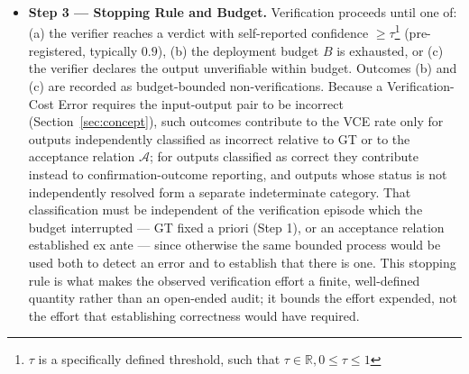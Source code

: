 \documentclass[11pt]{article}
\newcommand{\drift}[1]{\textcolor{cyan!85!black}{#1}}
\newcommand{\viola}[1]{\textcolor[HTML]{7030A0}{#1}}
\newcommand{\drift}[1]{#1}
\newcommand{\viola}[1]{#1}
\begin{document}
\begin{itemize}
    \item \textbf{Step 3 --- Stopping Rule and Budget.} {Verification proceeds until one of: (a) the verifier reaches a verdict with self-reported confidence $\geq \tau$\footnote{{$\tau$ is a specifically defined threshold, such that $\tau \in \mathbb{R}, 0 \le \tau \le 1$}} (pre-registered, typically $0.9$), (b) the deployment budget $B$ is exhausted, or (c) the verifier declares the output unverifiable within budget. \drift{Outcomes (b) and (c) are recorded as budget-bounded non-verifications. Because a Verification-Cost Error requires the input-output pair to be incorrect (Section~\ref{sec:concept}), such outcomes contribute to the VCE rate only for outputs independently classified as incorrect relative to GT or to the acceptance relation $\mathcal{A}$; for outputs classified as correct \viola{they contribute instead to confirmation-outcome reporting}, and outputs whose status is not independently resolved form a separate indeterminate category. That classification must be independent of the verification episode which the budget interrupted --- GT fixed a priori (Step 1), or an acceptance relation established ex ante --- since otherwise the same bounded process would be used both to detect an error and to establish that there is one.} \viola{This stopping rule is what makes the observed verification effort a finite, well-defined quantity rather than an open-ended audit; it bounds the effort expended, not the effort that establishing correctness would have required.}}

\end{itemize}
\end{document}
